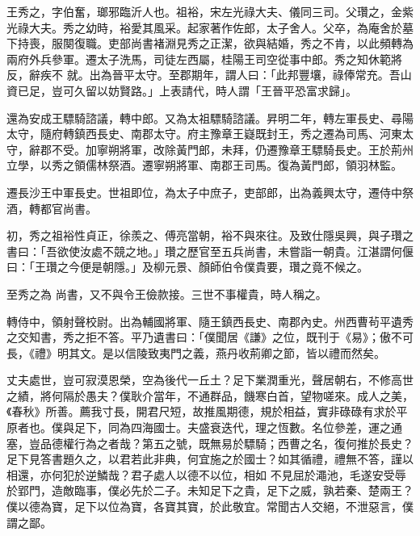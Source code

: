 
\begin{pinyinscope}

 王秀之，字伯奮，瑯邪臨沂人也。祖裕，宋左光祿大夫、儀同三司。父瓚之，金紫光祿大夫。秀之幼時，裕愛其風采。起家著作佐郎，太子舍人。父卒，為庵舍於墓下持喪，服闋復職。吏部尚書褚淵見秀之正潔，欲與結婚，秀之不肯，以此頻轉為兩府外兵參軍。遷太子洗馬，司徒左西屬，桂陽王司空從事中郎。秀之知休範將反，辭疾不
 就。出為晉平太守。至郡期年，謂人曰：「此邦豐壤，祿俸常充。吾山資已足，豈可久留以妨賢路。」上表請代，時人謂「王晉平恐富求歸」。



 還為安成王驃騎諮議，轉中郎。又為太祖驃騎諮議。昇明二年，轉左軍長史、尋陽太守，隨府轉鎮西長史、南郡太守。府主豫章王嶷既封王，秀之遷為司馬、河東太守，辭郡不受。加寧朔將軍，改除黃門郎，未拜，仍遷豫章王驃騎長史。王於荊州立學，以秀之領儒林祭酒。遷寧朔將軍、南郡王司馬。復為黃門郎，領羽林監。



 遷長沙王中軍長史。世祖即位，為太子中庶子，吏部郎，出為義興太守，遷侍中祭酒，轉都官尚書。



 初，秀之祖裕性貞正，徐羨之、傅亮當朝，裕不與來往。及致仕隱吳興，與子瓚之書曰：「吾欲使汝處不競之地。」瓚之歷官至五兵尚書，未嘗詣一朝貴。江湛謂何偃曰：「王瓚之今便是朝隱。」及柳元景、顏師伯令僕貴要，瓚之竟不候之。



 至秀之為
 尚書，又不與令王儉款接。三世不事權貴，時人稱之。



 轉侍中，領射聲校尉。出為輔國將軍、隨王鎮西長史、南郡內史。州西曹茍平遺秀之交知書，秀之拒不答。平乃遺書曰：「僕聞居《謙》之位，既刊于《易》；傲不可長，《禮》明其文。是以信陵致夷門之義，燕丹收荊卿之節，皆以禮而然矣。



 丈夫處世，豈可寂漠恩榮，空為後代一丘土？足下業潤重光，聲居朝右，不修高世之績，將何隔於愚夫？僕耿介當年，不通群品，饑寒白首，望物嗟來。成人之美，《春秋》所善。薦我寸長，開君尺短，故推風期德，規於相益，實非碌碌有求於平原者也。僕與足下，同為四海國士。夫盛衰迭代，理之恆數。名位參差，運之通塞，豈品德權行為之者哉？第五之號，既無易於驃騎；西曹之名，復何推於長史？足下見答書題久之，以君若此非典，何宜施之於國士？如其循禮，禮無不答，謹以相還，亦何犯於逆鱗哉？君子處人以德不以位，相如
 不見屈於澠池，毛遂安受辱於郢門，造敵臨事，僕必先於二子。未知足下之貴，足下之威，孰若秦、楚兩王？僕以德為寶，足下以位為寶，各寶其寶，於此敬宜。常聞古人交絕，不泄惡言，僕謂之鄙。




\end{pinyinscope}

